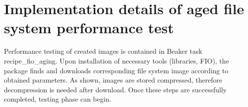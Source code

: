 \documentclass[
  color, %
  table, %
  lof,   %
  lot,   %
]{fithesis3}
\begin{document}







\section{Implementation details of aged file system performance test}
Performance testing of created images is contained in Beaker task recipe\_fio\_aging. Upon installation of necessary tools (libraries, FIO), the package finds and downloads corresponding file system image according to obtained parameters. As shown, images are stored compressed, therefore decompression is needed after download. Once these steps are successfully completed, testing phase can begin.
\end{document}
